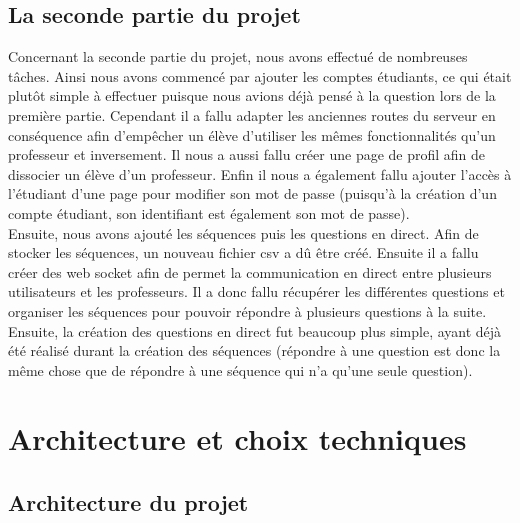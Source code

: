 \documentclass[a4paper, 12pt]{article}
\begin{document}
\subsection{La seconde partie du projet}

Concernant la seconde partie du projet, nous avons effectué de nombreuses tâches.
Ainsi nous avons commencé par ajouter les comptes étudiants, ce qui était plutôt simple à effectuer puisque nous avions déjà pensé à la question lors de la première partie. 
Cependant il a fallu adapter les anciennes routes du serveur en conséquence afin d'empêcher un élève d'utiliser les mêmes fonctionnalités qu'un professeur et inversement.
Il nous a aussi fallu créer une page de profil afin de dissocier un élève d'un professeur. 
Enfin il nous a également fallu ajouter l'accès à l'étudiant d'une page pour modifier son mot de passe (puisqu'à la création d'un compte étudiant, son identifiant est également son mot de passe). 
\\Ensuite, nous avons ajouté les séquences puis les questions en direct. 
Afin de stocker les séquences, un nouveau fichier csv a dû être créé. Ensuite il a fallu créer des web socket afin de permet la communication en direct entre plusieurs utilisateurs et les professeurs. Il a donc fallu récupérer les différentes questions et organiser les séquences pour pouvoir répondre à plusieurs questions à la suite. Ensuite, la création des questions en direct fut beaucoup plus simple, ayant déjà été réalisé durant la création des séquences (répondre à une question est donc la même chose que de répondre à une séquence qui n'a qu'une seule question). 

\section{Architecture et choix techniques}

\subsection{Architecture du projet}
\end{document}
